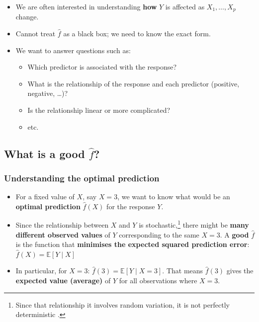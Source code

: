 \documentclass[
  letterpaper,
  DIV=11,
  numbers=noendperiod]{scrartcl}
\providecommand{\tightlist}{%
  \setlength{\itemsep}{0pt}\setlength{\parskip}{0pt}}\usepackage{longtable,booktabs,array}
\begin{document}
\begin{itemize}
\tightlist
\item
  We are often interested in understanding \textbf{how} \(Y\) is
  affected as \(X_1, \dots, X_p\) change.
\item
  Cannot treat \(\hat{f}\) as a black box; we need to know the exact
  form.
\item
  We want to answer questions such as:

  \begin{itemize}
  \tightlist
  \item
    Which predictor is associated with the response?
  \item
    What is the relationship of the response and each predictor
    (positive, negative, \ldots)?
  \item
    Is the relationship linear or more complicated?
  \item
    etc.
  \end{itemize}
\end{itemize}

\subsection{\texorpdfstring{What is a good
\(\hat{f}\)?}{What is a good \textbackslash hat\{f\}?}}\label{what-is-a-good-hatf}

\subsubsection{Understanding the optimal
prediction}\label{understanding-the-optimal-prediction}

\begin{itemize}
\item
  For a fixed value of \(X\), say \(X = 3\), we want to know what would
  be an \textbf{optimal prediction} \(\hat{f}(X)\) for the response
  \(Y\).
\item
  Since the relationship between \(X\) and \(Y\) is
  stochastic,\footnote{Since that relationship it involves random
    variation, it is not perfectly deterministic .} there might be
  \textbf{many different observed values} of \(Y\) corresponding to the
  same \(X = 3\). A \textbf{good} \(\hat{f}\) is the function that
  \textbf{minimises the expected squared prediction error}:
  \(\hat{f}(X) = \mathbb{E}[Y \mid X]\)
\end{itemize}

\begin{itemize}
\tightlist
\item
  In particular, for \(X = 3\):
  \(\hat{f}(3) = \mathbb{E}[Y \mid X = 3]\). That means \(\hat{f}(3)\)
  gives the \textbf{expected value (average)} of \(Y\) for all
  observations where \(X = 3\).
\end{itemize}
\end{document}
